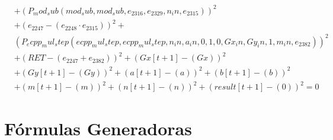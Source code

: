 \documentclass[10pt, a4paper]{article}
\begin{document}
\begin{align*}
& + (P_mod_sub(mod_sub, mod_sub, e_{2316}, e_{2329}, n_in, e_{2315}))^{2} \\
& + (e_{2247} - (e_{2248}  \cdot  e_{2315}))^{2} + \\
& (P_ecpp_mul_step(ecpp_mul_step, ecpp_mul_step, n_in, a_in, 0, 1, 0, Gx_in, Gy_in, 1, m_in, e_{2382}))^{2} \\
& + (RET - (e_{2247} + e_{2382}))^{2} + (Gx[t+1] - (Gx))^{2} \\
& + (Gy[t+1] - (Gy))^{2} + (a[t+1] - (a))^{2} + (b[t+1] - (b))^{2} \\
& + (m[t+1] - (m))^{2} + (n[t+1] - (n))^{2} + (result[t+1] - (0))^{2} = 0
\end{align*}\part{Fórmulas Generadoras}
\end{document}
